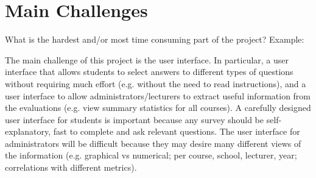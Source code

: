 \section{Main Challenges}
\label{sec:challenges}

What is  the hardest and/or most time consuming part of the project? Example:

The main challenge of this project is the user interface. In particular, a user interface that allows students to select answers to different types of questions without requiring much effort (e.g. without the need to read instructions), and a user interface to allow administrators/lecturers to extract useful information from the evaluations (e.g. view summary statistics for all courses). A carefully designed user interface for students is important because any survey should be self-explanatory, fast to complete and ask relevant questions. The user interface for administrators will be difficult because they may desire many different views of the information (e.g. graphical vs numerical; per course, school, lecturer, year; correlations with different metrics).

